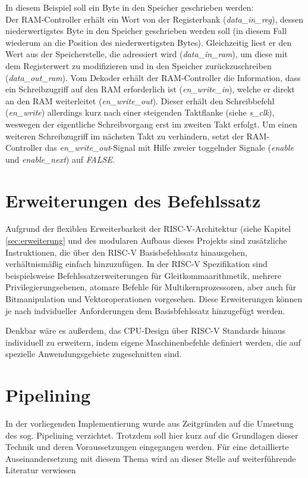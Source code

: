 In diesem Beispiel soll ein Byte in den Speicher geschrieben werden:\\
Der RAM-Controller erhält ein Wort von der Registerbank (\textit{data\_in\_reg}), dessen niederwertigstes Byte in den Speicher geschrieben werden soll (in diesem Fall wiederum an die Position des niederwertigsten Bytes).
Gleichzeitig liest er den Wert aus der Speicherstelle, die adressiert wird  (\textit{data\_in\_ram}), um diese mit dem Registerwert zu modifizieren und in den Speicher zurückzuschreiben (\textit{data\_out\_ram}).
Vom Dekoder erhält der RAM-Controller die Information, dass ein Schreibzugriff auf den RAM erforderlich ist (\textit{en\_write\_in}), welche er direkt an den RAM weiterleitet (\textit{en\_write\_out}).
Dieser erhält den Schreibbefehl (\textit{en\_write}) allerdings kurz nach einer steigenden Taktflanke (siehe \textit{s\_clk}), weswegen der eigentliche Schreibvorgang erst im zweiten Takt erfolgt.
Um einen weiteren Schreibzugriff im nächsten Takt zu verhindern, setzt der RAM-Controller das \textit{en\_write\_out}-Signal  mit Hilfe zweier toggelnder Signale (\textit{enable} und \textit{enable\_next}) auf \textit{FALSE}.




\section{Erweiterungen des Befehlssatz}

Aufgrund der flexiblen Erweiterbarkeit der RISC-V-Architektur (siehe Kapitel \ref{sec:erweiterung} und des modularen Aufbaus dieses Projekts sind zusätzliche Instruktionen, die über den RISC-V Basisbefehlssatz hinausgehen, verhältnismäßig einfach hinzuzufügen. In der RISC-V Spezifikation sind beispielsweise Befehlssatzerweiterungen für Gleitkommaarithmetik, mehrere Privilegierungsebenen, atomare Befehle für Multikernprozessoren, aber auch für Bitmanipulation und Vektoroperationen vorgesehen. \cite[S. 4f.]{RISC} Diese Erweiterungen können je nach indvidueller Anforderungen dem Basisbfehlssatz hinzugefügt werden.
 
Denkbar wäre es außerdem, das CPU-Design über RISC-V Standards hinaus individuell zu erweitern, indem eigene Maschinenbefehle definiert werden, die auf spezielle Anwendungsgebiete zugeschnitten sind.

\section{Pipelining}
In der vorliegenden Implementierung wurde aus Zeitgründen auf die Umsetung des sog. Pipelining verzichtet. 
Trotzdem soll hier kurz auf die Grundlagen dieser Technik und deren Voraussetzungen eingegangen werden.
Für eine detaillierte Auseinandersetzung mit diesem Thema wird an dieser Stelle auf weiterführende Literatur verwiesen~\cite[A-2 ff.]{Hennessy}

